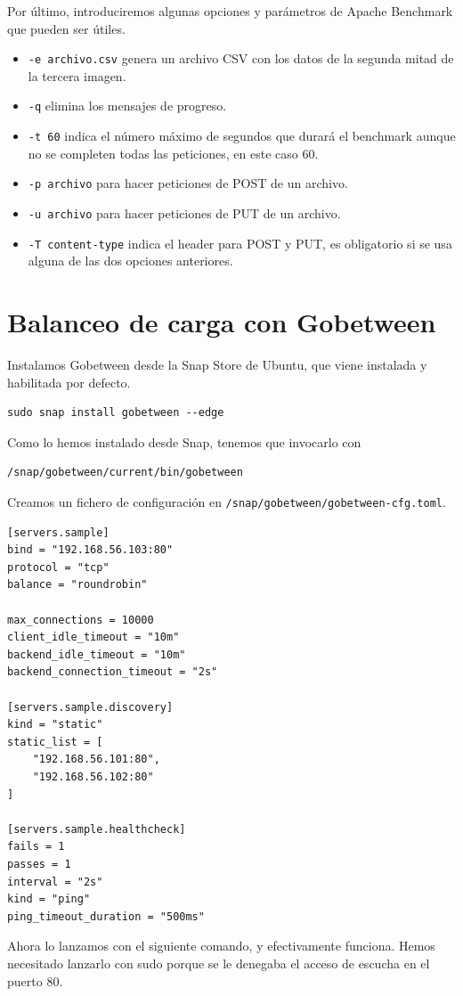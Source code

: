 \documentclass{article}
\begin{document}
Por último, introduciremos algunas opciones y parámetros de Apache Benchmark que pueden ser útiles.
\begin{itemize}
	\item \texttt{-e archivo.csv} genera un archivo CSV con los datos de la segunda mitad de la tercera imagen.
	\item \texttt{-q} elimina los mensajes de progreso.
	\item \texttt{-t 60} indica el número máximo de segundos que durará el benchmark aunque no se completen todas
	las peticiones, en este caso 60.
	\item \texttt{-p archivo} para hacer peticiones de POST de un archivo.
	\item \texttt{-u archivo} para hacer peticiones de PUT de un archivo.
	\item \texttt{-T content-type} indica el header para POST y PUT, es obligatorio si se usa alguna de las dos opciones anteriores.
\end{itemize}

\section{Balanceo de carga con Gobetween}

Instalamos Gobetween desde la Snap Store de Ubuntu, que viene instalada y habilitada por defecto.
\begin{Verbatim}[tabsize=4]
sudo snap install gobetween --edge
\end{Verbatim}

Como lo hemos instalado desde Snap, tenemos que invocarlo con
\begin{Verbatim}[tabsize=4]
/snap/gobetween/current/bin/gobetween
\end{Verbatim}

Creamos un fichero de configuración en \texttt{/snap/gobetween/gobetween-cfg.toml}.
\begin{Verbatim}[tabsize=4]
[servers.sample]
bind = "192.168.56.103:80"
protocol = "tcp"
balance = "roundrobin"

max_connections = 10000
client_idle_timeout = "10m"
backend_idle_timeout = "10m"
backend_connection_timeout = "2s"

[servers.sample.discovery]
kind = "static"
static_list = [
	"192.168.56.101:80",
	"192.168.56.102:80"
]

[servers.sample.healthcheck]
fails = 1
passes = 1
interval = "2s"
kind = "ping"
ping_timeout_duration = "500ms"
\end{Verbatim}
Ahora lo lanzamos con el siguiente comando, y efectivamente funciona. Hemos necesitado lanzarlo con sudo porque
se le denegaba el acceso de escucha en el puerto 80.
\end{document}
